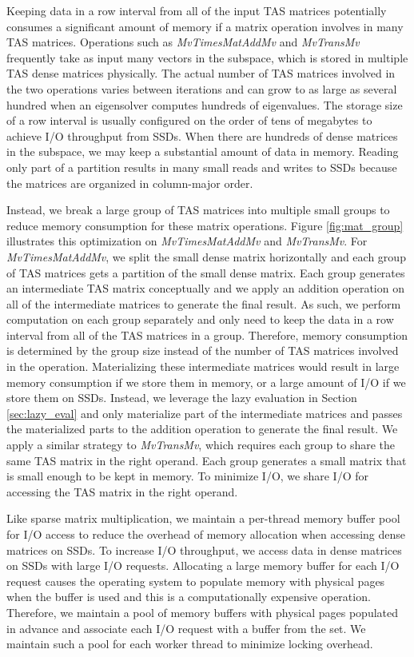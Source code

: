 Keeping data in a row interval from all of the input TAS matrices potentially
consumes a significant amount of memory if a matrix operation involves in many
TAS matrices.
Operations such as \textit{MvTimesMatAddMv} and \textit{MvTransMv} frequently
take as input many vectors in the subspace, which is stored in multiple TAS
dense matrices physically. The actual number of TAS matrices involved in
the two operations varies between iterations and can grow to as large as several
hundred when an eigensolver computes hundreds of eigenvalues. The storage size
of a row interval is usually configured on the order of tens of megabytes to
achieve I/O throughput from SSDs. When there are hundreds of dense matrices in
the subspace, we may keep a substantial amount of data in memory.
Reading only part of a partition results in many small reads and writes to
SSDs because the matrices are organized in column-major order.

Instead, we break a large group of TAS matrices into multiple small groups to
reduce memory consumption for these matrix operations. Figure \ref{fig:mat_group}
illustrates this optimization on \textit{MvTimesMatAddMv} and \textit{MvTransMv}.
For \textit{MvTimesMatAddMv}, we split the small dense matrix horizontally and
each group of TAS matrices gets a partition of the small dense matrix. Each group
generates an intermediate TAS matrix conceptually and we apply an addition
operation on all of the intermediate matrices to generate the final result.
As such, we perform computation on each group separately and only need to keep
the data in a row interval from all of the TAS matrices in a group. Therefore,
memory consumption is determined by the group size instead of the number of TAS
matrices involved in the operation. Materializing these
intermediate matrices would result in large memory consumption if we store them
in memory, or a large amount of I/O if we store them on SSDs. Instead, we leverage
the lazy evaluation in Section \ref{sec:lazy_eval} and only materialize part of
the intermediate matrices and passes the materialized parts to
the addition operation to generate the final result. We apply a similar strategy
to \textit{MvTransMv}, which requires each group to share the same TAS matrix in
the right operand. Each group generates a small matrix that is small enough to
be kept in memory. To minimize I/O, we share I/O for accessing the TAS matrix
in the right operand.

Like sparse matrix multiplication, we maintain a per-thread memory buffer pool
for I/O access to reduce the overhead of memory allocation when accessing dense
matrices on SSDs. To increase I/O throughput, we access data in dense matrices
on SSDs with large I/O requests. Allocating a large memory buffer for each I/O
request causes the operating system to populate memory with physical pages
when the buffer is used and this is a computationally expensive operation.
Therefore, we maintain a pool of memory buffers
with physical pages populated in advance and associate each I/O request with
a buffer from the set. We maintain such a pool for each worker thread to
minimize locking overhead.

